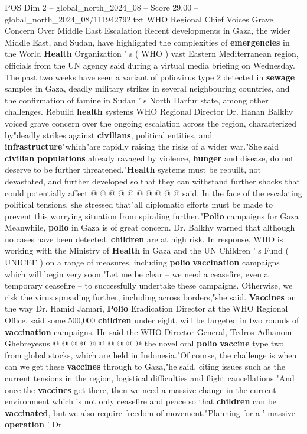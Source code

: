 \begin{textsample}{POS Dim 2 – global\_north\_2024\_08 – Score 29.00 – global\_north\_2024\_08/111942792.txt}  \label{ex:f2_pos_394}
WHO Regional Chief Voices Grave Concern Over Middle East Escalation Recent developments in Gaza, the wider Middle East, and Sudan, have highlighted the complexities of \textbf{emergencies} in the World \textbf{Health} Organization ' s ( WHO ) vast Eastern Mediterranean region, officials from the UN agency said during a virtual media briefing on Wednesday.
The past two weeks have seen a variant of poliovirus type 2 detected in \textbf{sewage} samples in Gaza, deadly military strikes in several neighbouring countries, and the confirmation of famine in Sudan ' s North Darfur state, among other challenges.
Rebuild \textbf{health} systems WHO Regional Director Dr.
Hanan Balkhy voiced grave concern over the ongoing escalation across the region, characterized by"deadly strikes against \textbf{civilians}, political entities, and \textbf{infrastructure}"which"are rapidly raising the risks of a wider war."She said \textbf{civilian} \textbf{populations} already ravaged by violence, \textbf{hunger} and disease, do not deserve to be further threatened."\textbf{Health} systems must be rebuilt, not devastated, and further developed so that they can withstand further shocks that could potentially affect @ @ @ @ @ @ @ @ @ @ said.
In the face of the escalating political tensions, she stressed that"all diplomatic efforts must be made to prevent this worrying situation from spiraling further."\textbf{Polio} campaigns for Gaza Meanwhile, \textbf{polio} in Gaza is of great concern.
Dr.
Balkhy warned that although no cases have been detected, \textbf{children} are at high risk.
In response, WHO is working with the Ministry of \textbf{Health} in Gaza and the UN Children ' s Fund ( UNICEF ) on a range of measures, including \textbf{polio} \textbf{vaccination} campaigns which will begin very soon."Let me be clear -- we need a ceasefire, even a temporary ceasefire -- to successfully undertake these campaigns.
Otherwise, we risk the virus spreading further, including across borders,"she said. \textbf{Vaccines} on the way Dr.
Hamid Jamari, \textbf{Polio} Eradication Director at the WHO Regional Office, said some 500,000 \textbf{children} under eight, will be targeted in two rounds of \textbf{vaccination} campaigns.
He said the WHO Director-General, Tedros Adhanom Ghebreyesus @ @ @ @ @ @ @ @ @ @ the novel oral \textbf{polio} \textbf{vaccine} type two from global stocks, which are held in Indonesia."Of course, the challenge is when can we get these \textbf{vaccines} through to Gaza,"he said, citing issues such as the current tensions in the region, logistical difficulties and flight cancellations."And once the \textbf{vaccines} get there, then we need a massive change in the current environment which is not only ceasefire and peace so that \textbf{children} can be \textbf{vaccinated}, but we also require freedom of movement."Planning for a ' massive \textbf{operation} ' Dr.

\end{textsample}
